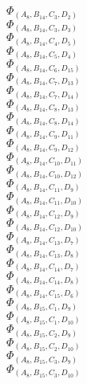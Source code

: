 \documentclass[14pt]{article}
\begin{document}
    $\Phi_{({A}_{8}, {B}_{14}, {C}_{3}, {D}_{2})}$ \\ 
    $\Phi_{({A}_{8}, {B}_{14}, {C}_{3}, {D}_{3})}$ \\ 
    $\Phi_{({A}_{8}, {B}_{14}, {C}_{4}, {D}_{5})}$ \\ 
    $\Phi_{({A}_{8}, {B}_{14}, {C}_{5}, {D}_{4})}$ \\ 
    $\Phi_{({A}_{8}, {B}_{14}, {C}_{6}, {D}_{15})}$ \\ 
    $\Phi_{({A}_{8}, {B}_{14}, {C}_{7}, {D}_{13})}$ \\ 
    $\Phi_{({A}_{8}, {B}_{14}, {C}_{7}, {D}_{14})}$ \\ 
    $\Phi_{({A}_{8}, {B}_{14}, {C}_{8}, {D}_{13})}$ \\ 
    $\Phi_{({A}_{8}, {B}_{14}, {C}_{8}, {D}_{14})}$ \\ 
    $\Phi_{({A}_{8}, {B}_{14}, {C}_{9}, {D}_{11})}$ \\ 
    $\Phi_{({A}_{8}, {B}_{14}, {C}_{9}, {D}_{12})}$ \\ 
    $\Phi_{({A}_{8}, {B}_{14}, {C}_{10}, {D}_{11})}$ \\ 
    $\Phi_{({A}_{8}, {B}_{14}, {C}_{10}, {D}_{12})}$ \\ 
    $\Phi_{({A}_{8}, {B}_{14}, {C}_{11}, {D}_{9})}$ \\ 
    $\Phi_{({A}_{8}, {B}_{14}, {C}_{11}, {D}_{10})}$ \\ 
    $\Phi_{({A}_{8}, {B}_{14}, {C}_{12}, {D}_{9})}$ \\ 
    $\Phi_{({A}_{8}, {B}_{14}, {C}_{12}, {D}_{10})}$ \\ 
    $\Phi_{({A}_{8}, {B}_{14}, {C}_{13}, {D}_{7})}$ \\ 
    $\Phi_{({A}_{8}, {B}_{14}, {C}_{13}, {D}_{8})}$ \\ 
    $\Phi_{({A}_{8}, {B}_{14}, {C}_{14}, {D}_{7})}$ \\ 
    $\Phi_{({A}_{8}, {B}_{14}, {C}_{14}, {D}_{8})}$ \\ 
    $\Phi_{({A}_{8}, {B}_{14}, {C}_{15}, {D}_{6})}$ \\ 
    $\Phi_{({A}_{8}, {B}_{15}, {C}_{1}, {D}_{9})}$ \\ 
    $\Phi_{({A}_{8}, {B}_{15}, {C}_{1}, {D}_{10})}$ \\ 
    $\Phi_{({A}_{8}, {B}_{15}, {C}_{2}, {D}_{9})}$ \\ 
    $\Phi_{({A}_{8}, {B}_{15}, {C}_{2}, {D}_{10})}$ \\ 
    $\Phi_{({A}_{8}, {B}_{15}, {C}_{3}, {D}_{9})}$ \\ 
    $\Phi_{({A}_{8}, {B}_{15}, {C}_{3}, {D}_{10})}$ \\ 
\end{document}

